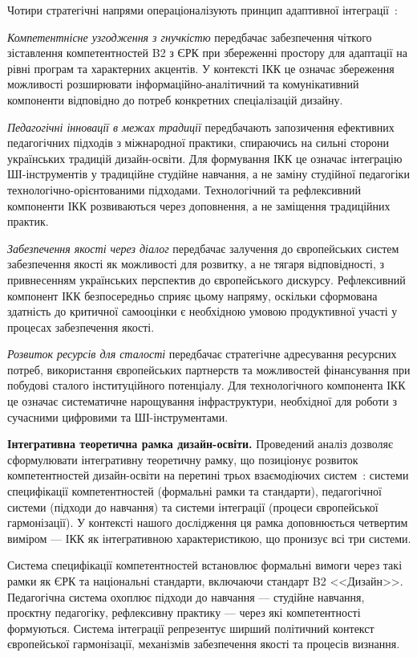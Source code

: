 Чотири стратегічні напрями операціоналізують принцип адаптивної інтеграції~\cite{Musiienko2025DesignEducation}:

\emph{Компетентнісне узгодження з гнучкістю} передбачає забезпечення чіткого зіставлення компетентностей B2 з ЄРК при збереженні простору для адаптації на рівні програм та характерних акцентів. У контексті ІКК це означає збереження можливості розширювати інформаційно-аналітичний та комунікативний компоненти відповідно до потреб конкретних спеціалізацій дизайну.

\emph{Педагогічні інновації в межах традиції} передбачають запозичення ефективних педагогічних підходів з міжнародної практики, спираючись на сильні сторони українських традицій дизайн-освіти. Для формування ІКК це означає інтеграцію ШІ-інструментів у традиційне студійне навчання, а не заміну студійної педагогіки технологічно-орієнтованими підходами. Технологічний та рефлексивний компоненти ІКК розвиваються через доповнення, а не заміщення традиційних практик.

\emph{Забезпечення якості через діалог} передбачає залучення до європейських систем забезпечення якості як можливості для розвитку, а не тягаря відповідності, з привнесенням українських перспектив до європейського дискурсу. Рефлексивний компонент ІКК безпосередньо сприяє цьому напряму, оскільки сформована здатність до критичної самооцінки є необхідною умовою продуктивної участі у процесах забезпечення якості.

\emph{Розвиток ресурсів для сталості} передбачає стратегічне адресування ресурсних потреб, використання європейських партнерств та можливостей фінансування при побудові сталого інституційного потенціалу. Для технологічного компонента ІКК це означає систематичне нарощування інфраструктури, необхідної для роботи з сучасними цифровими та ШІ-інструментами.

\textbf{Інтегративна теоретична рамка дизайн-освіти.} Проведений аналіз дозволяє сформулювати інтегративну теоретичну рамку, що позиціонує розвиток компетентностей дизайн-освіти на перетині трьох взаємодіючих систем~\cite{Musiienko2025DesignEducation}: системи специфікації компетентностей (формальні рамки та стандарти), педагогічної системи (підходи до навчання) та системи інтеграції (процеси європейської гармонізації). У контексті нашого дослідження ця рамка доповнюється четвертим виміром --- ІКК як інтегративною характеристикою, що пронизує всі три системи.

Система специфікації компетентностей встановлює формальні вимоги через такі рамки як ЄРК та національні стандарти, включаючи стандарт B2 <<Дизайн>>. Педагогічна система охоплює підходи до навчання --- студійне навчання, проєктну педагогіку, рефлексивну практику --- через які компетентності формуються. Система інтеграції репрезентує ширший політичний контекст європейської гармонізації, механізмів забезпечення якості та процесів визнання.

